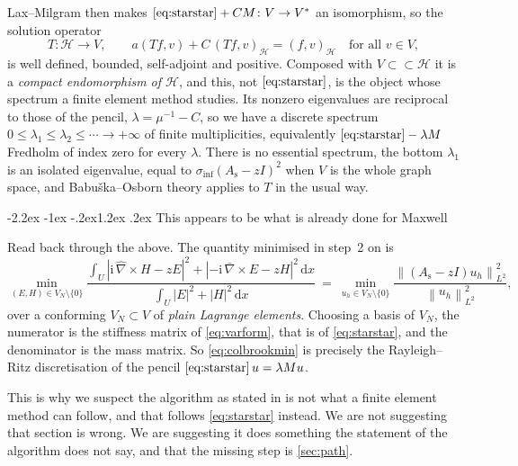 \documentclass[11pt,a4paper]{article}
\makeatletter
\newcommand{\norm}[1]{\left\|#1\right\|}
\newcommand{\abs}[1]{\left|#1\right|}
\newcommand{\Hb}{\mathcal{H}}
\newcommand{\ii}{\mathrm{i}}
\newcommand{\bcurl}{\bar\nabla\times}
\newcommand{\hcurl}{\hat\nabla\times}
\newcommand{\siginf}{\sigma_{\inf}}
\newcommand{\Astr}{A_{\mathrm{s}}}
\renewcommand\subsection{\@startsection{subsection}{2}{\z@}%
  {-2.2ex \@plus -1ex \@minus -.2ex}{1.2ex \@plus.2ex}%
  {\normalfont\large\bfseries}}
\makeatother
\begin{document}
Lax--Milgram then makes $\eqref{eq:starstar} + CM \colon V \to V^*$ an
isomorphism, so the solution operator
\begin{equation}
  \label{eq:solop}
  T \colon \Hb \to V, \qquad
  a(Tf, v) + C\,(Tf, v)_{\Hb} = (f,v)_{\Hb}
  \quad \text{for all } v \in V,
\end{equation}
is well defined, bounded, self-adjoint and positive.  Composed with
$V \subset\subset \Hb$ it is a
\emph{compact endomorphism of $\Hb$}, and this, not $\eqref{eq:starstar}$, is
the object whose spectrum a finite element method studies.  Its nonzero
eigenvalues are reciprocal to those of the pencil, $\lambda = \mu^{-1} - C$, so we have a
discrete spectrum $0 \le \lambda_1 \le \lambda_2 \le \cdots
\to +\infty$ of finite multiplicities, equivalently
$\eqref{eq:starstar} - \lambda M$ Fredholm of index zero for every $\lambda$.
There is no essential spectrum, the bottom $\lambda_1$ is an isolated eigenvalue,
equal to $\siginf(\Astr - zI)^2$ when $V$ is the whole graph space, and
Babu\v{s}ka--Osborn theory \cite{BabuskaOsborn1991,Boffi2010} applies to $T$ in
the usual way.

\subsection{This appears to be what is already done for Maxwell}
\label{sec:already}

Read \cite[\S3.4.4]{Colbrook2026} back through the above.  The quantity minimised
in step~2 on \cite[p.~132]{Colbrook2026} is
\begin{equation}
  \label{eq:colbrookmin}
  \min_{(E,H) \in V_N \setminus \{0\}}
    \frac{\int_U \abs{\ii\,\hcurl H - zE}^2
                 + \abs{-\ii\,\bcurl E - zH}^2 \,\mathrm{d}x}
         {\int_U \abs{E}^2 + \abs{H}^2 \,\mathrm{d}x}
  \ =\ \min_{u_h \in V_N\setminus\{0\}}
    \frac{\norm{(\Astr - zI)u_h}^2_{L^2}}{\norm{u_h}^2_{L^2}} ,
\end{equation}
over a conforming $V_N \subset V$ of \emph{plain Lagrange elements}.  Choosing a
basis of $V_N$, the numerator is the stiffness matrix of \eqref{eq:varform},
that is of \eqref{eq:starstar}, and the denominator is the mass matrix.  So
\eqref{eq:colbrookmin} is precisely the Rayleigh--Ritz discretisation of the
pencil $\eqref{eq:starstar}\,u = \lambda M u$.

This is why we suspect the algorithm as stated in \cite[\S3.4.1]{Colbrook2026}
is not what a finite element method can follow, and that
\cite[\S3.4.4]{Colbrook2026} follows \eqref{eq:starstar} instead.  We are not
suggesting that section is wrong.  We are suggesting it does something the
statement of the algorithm does not say, and that the missing step is
\cref{sec:path}.
\end{document}
